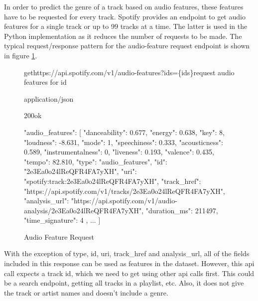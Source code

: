 In order to predict the genre of a track based on audio features, these features have to be requested
for every track. Spotify provides an endpoint to get audio features for a single track or up to 99 tracks at
a time. The latter is used in the Python implementation as it reduces the number of requests to be made.
The typical request/response pattern for the audio-feature request endpoint is shown in
figure \ref{fig:Audio Feature Request}.

\begin{figure}[H]
    \caption{Audio Feature Request}
	\label{fig:Audio Feature Request}
\begin{apiRoute}{get}{https://api.spotify.com/v1/audio-features?ids=\{ids\}}{request audio features for id}
    \methodJson
    \begin{routeParameter}
    \end{routeParameter}
    \begin{routeResponse}{application/json}
        \begin{routeResponseItem}{200}{ok}
            \begin{routeResponseItemBody}
{
    "audio_features": [
        {
            "danceability": 0.677,
            "energy": 0.638,
            "key": 8,
            "loudness": -8.631,
            "mode": 1,
            "speechiness": 0.333,
            "acousticness": 0.589,
            "instrumentalness": 0,
            "liveness": 0.193,
            "valence": 0.435,
            "tempo": 82.810,
            "type": "audio_features",
            "id": "2e3Ea0o24lReQFR4FA7yXH",
            "uri": "spotify:track:2e3Ea0o24lReQFR4FA7yXH",
            "track_href": "https://api.spotify.com/v1/tracks/2e3Ea0o24lReQFR4FA7yXH",
            "analysis_url": "https://api.spotify.com/v1/audio-analysis/2e3Ea0o24lReQFR4FA7yXH",
            "duration_ms": 211497,
            "time_signature": 4
        },
        ...
    ]
}
            \end{routeResponseItemBody}
        \end{routeResponseItem}
    \end{routeResponse}
\end{apiRoute}
\end{figure}

With the exception of type, id, uri, track\_href and analysis\_url, all of the fields included in this response
can be used as features in the dataset. However, this api call expects a track id, which we need to get using
other api calls first. This could be a search endpoint, getting all tracks in a playlist, etc.
Also, it does not give the track or artist names and doesn't include a genre.

